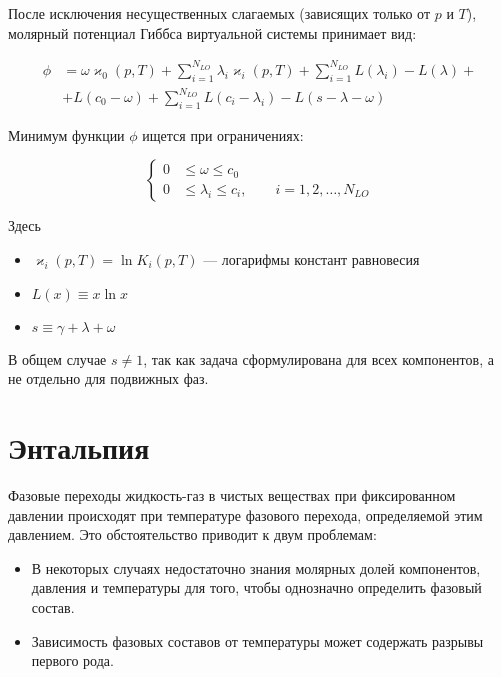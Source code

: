﻿\documentclass[12pt]{article}
\renewcommand{\leq}{\leqslant}
\begin{document}
После исключения несущественных слагаемых (зависящих только от $p$ и $T$), молярный потенциал Гиббса виртуальной
системы принимает вид:

\begin{equation}
\begin{aligned}
{\phi} &= \omega \varkappa_0(p,T) + \sum_{i=1}^{N_{LO}} \lambda_i \varkappa_i(p,T) + \sum_{i=1}^{N_{LO}} L(\lambda_i) - L(\lambda) + \\
&+ L(c_0 - \omega) + \sum_{i=1}^{N_{LO}} L(c_i - \lambda_i) - L(s - \lambda - \omega)
\end{aligned}
\label{eq:pproblem}
\end{equation}

Минимум функции $\phi$ ищется при ограничениях:

\begin{equation}
\left\{
\begin{aligned}
0& \leq \omega \leq c_0\\
0& \leq \lambda_i \leq c_i, \qquad i = 1,2,\dots,N_{LO}
\end{aligned}
\right. \label{eq:restr}
\end{equation}

Здесь
\begin{itemize}
\item $\varkappa_i(p, T) = \ln K_i(p, T)$ --- логарифмы констант равновесия \item $L(x) \equiv x \ln x$ \item $s \equiv
\gamma + \lambda + \omega$
\end{itemize}

В общем случае $s \ne 1$, так как задача сформулирована для всех компонентов, а не отдельно для подвижных фаз.



\section{Энтальпия}
Фазовые переходы жидкость-газ в чистых веществах при фиксированном давлении происходят при температуре фазового
перехода, определяемой этим давлением. Это обстоятельство приводит к двум проблемам:
\begin{itemize}
\item В некоторых случаях недостаточно знания молярных долей компонентов, давления и температуры для того, чтобы
однозначно определить фазовый состав. \item Зависимость фазовых составов от температуры может содержать разрывы первого
рода.
\end{itemize}
\end{document}
